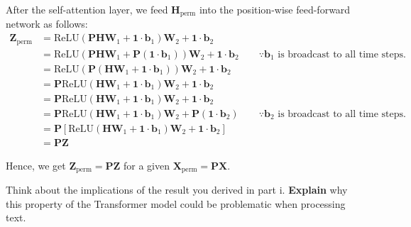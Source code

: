 \begin{parts}
\begin{subparts}
{            After the self-attention layer, we feed $\mathbf{H}_{\text{perm}}$ into the position-wise feed-forward network as follows:
            \begin{align*}
                \mathbf{Z}_{\text{perm}}
                &= \text{ReLU}(\mathbf{PH}\mathbf{W}_1 + \mathbf{1}\cdot\mathbf{b}_1)\mathbf{W}_2 + \mathbf{1}\cdot\mathbf{b}_2 \\
                &= \text{ReLU}(\mathbf{PH}\mathbf{W}_1 + \mathbf{P}(\mathbf{1}\cdot\mathbf{b}_1))\mathbf{W}_2 + \mathbf{1}\cdot\mathbf{b}_2 \quad\quad \because \mathbf{b}_1 \text{ is broadcast to all time steps.} \\
                &= \text{ReLU}(\mathbf{P}(\mathbf{H}\mathbf{W}_1 + \mathbf{1}\cdot\mathbf{b}_1))\mathbf{W}_2 + \mathbf{1}\cdot\mathbf{b}_2 \\
                &= \mathbf{P} \text{ReLU}(\mathbf{H}\mathbf{W}_1 + \mathbf{1}\cdot\mathbf{b}_1)\mathbf{W}_2 + \mathbf{1}\cdot\mathbf{b}_2 \\
                &= \mathbf{P} \text{ReLU}(\mathbf{H}\mathbf{W}_1 + \mathbf{1}\cdot\mathbf{b}_1)\mathbf{W}_2 + \mathbf{1}\cdot\mathbf{b}_2 \\
                &= \mathbf{P} \text{ReLU}(\mathbf{H}\mathbf{W}_1 + \mathbf{1}\cdot\mathbf{b}_1)\mathbf{W}_2 + \mathbf{P}(\mathbf{1}\cdot\mathbf{b}_2) \quad\quad \because \mathbf{b}_2 \text{ is broadcast to all time steps.} \\
                &= \mathbf{P}[\text{ReLU}(\mathbf{H}\mathbf{W}_1 + \mathbf{1}\cdot\mathbf{b}_1)\mathbf{W}_2 + \mathbf{1}\cdot\mathbf{b}_2] \\
                &= \mathbf{PZ}
            \end{align*}

            Hence, we get $\mathbf{Z}_{\text{perm}} = \mathbf{PZ}$ for a given $\mathbf{X}_{\text{perm}} = \mathbf{PX}$.
        }
        \subpart[1] Think about the implications of the result you derived in part i. \textbf{Explain} why this property of the Transformer model could be problematic when processing text.

    \end{subparts}


\end{parts}
